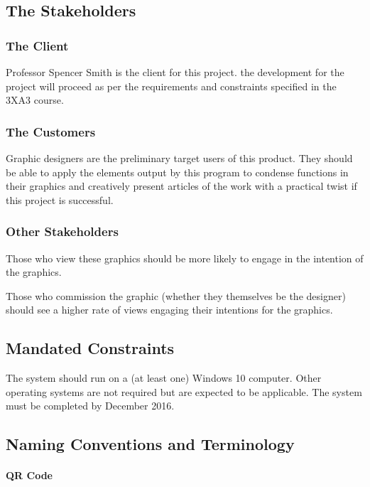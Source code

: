 \documentclass[12pt, titlepage]{article}
\begin{document}
\subsection{The Stakeholders}
	
\subsubsection{The Client}

	Professor Spencer Smith is the client for this project. %
	the development for 
	the project will proceed as per the requirements and constraints specified 
	in the 3XA3 course.

\subsubsection{The Customers}

	Graphic designers are the preliminary target users of this product. 
	They should be able to apply the elements output by this program to 
	condense functions in their graphics and creatively present articles of 
	the work with a practical twist if this project is successful.

\subsubsection{Other Stakeholders}

	Those who view these graphics should be more likely to engage in the 
	intention of the graphics.
	
	Those who commission the graphic (whether they themselves be the 
	designer) should see a higher rate of views engaging their intentions 
	for the graphics.

\subsection{Mandated Constraints}

	The system should run on a (at least one) Windows 10 computer. Other operating systems are not required but are 
	expected to be applicable. The system must be completed by December 2016.

\subsection{Naming Conventions and Terminology}

		\paragraph{QR Code}
		
\end{document}
